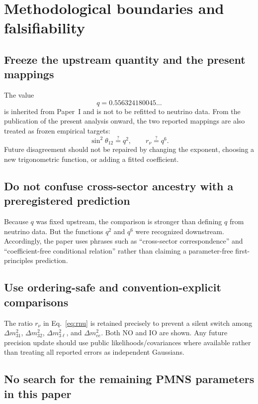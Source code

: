 \documentclass[10pt,twocolumn]{article}
\newcommand{\rnu}{r_{\nu}}
\begin{document}
\section{Methodological boundaries and falsifiability}
\label{sec:falsify}

\subsection{Freeze the upstream quantity and the present mappings}

The value
\begin{equation}
q=0.556324180045\ldots
\end{equation}
is inherited from Paper~I and is not to be refitted to neutrino data.  From the
publication of the present analysis onward, the two reported mappings are also
treated as frozen empirical targets:
\begin{equation}
\sin^2\theta_{12}\stackrel{?}{=}q^2,
\qquad
\rnu\stackrel{?}{=}q^6.
\end{equation}
Future disagreement should not be repaired by changing the exponent, choosing a
new trigonometric function, or adding a fitted coefficient.

\subsection{Do not confuse cross-sector ancestry with a preregistered prediction}

Because $q$ was fixed upstream, the comparison is stronger than defining $q$ from
neutrino data.  But the functions $q^2$ and $q^6$ were recognized downstream.
Accordingly, the paper uses phrases such as ``cross-sector correspondence'' and
``coefficient-free conditional relation'' rather than claiming a parameter-free
first-principles prediction.

\subsection{Use ordering-safe and convention-explicit comparisons}

The ratio $\rnu$ in Eq.~\eqref{eq:rnu} is retained precisely to prevent a silent
switch among $\Delta m^2_{31}$, $\Delta m^2_{32}$, $\Delta m^2_{3\ell}$, and
$\Delta m^2_{ee}$.  Both NO and IO are shown.  Any future precision update should
use public likelihoods/covariances where available rather than treating all
reported errors as independent Gaussians.

\subsection{No search for the remaining PMNS parameters in this paper}
\end{document}
